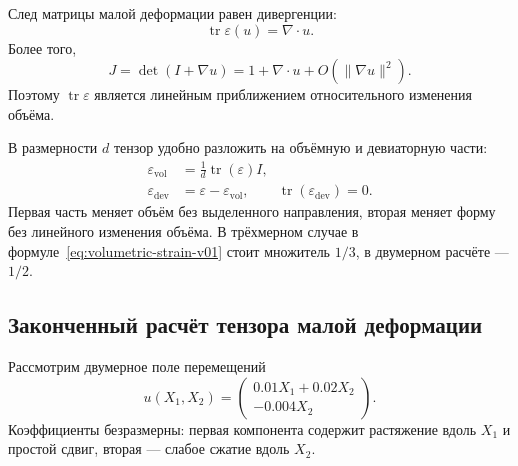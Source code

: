 След матрицы малой деформации равен дивергенции:
\begin{equation}
\label{eq:trace-strain-divergence-v01}
\operatorname{tr}\varepsilon(u)=\nabla\cdot u.
\end{equation}
Более того,
\begin{equation}
\label{eq:jacobian-linearization-v01}
J
=
\det(I+\nabla u)
=
1+\nabla\cdot u+O(\lVert\nabla u\rVert^2).
\end{equation}
Поэтому $\operatorname{tr}\varepsilon$ является линейным приближением относительного изменения объёма.

В размерности $d$ тензор удобно разложить на объёмную и девиаторную части:
\begin{align}
\varepsilon_{\mathrm{vol}}
&=
\frac1d\operatorname{tr}(\varepsilon)I,
\label{eq:volumetric-strain-v01}\\
\varepsilon_{\mathrm{dev}}
&=
\varepsilon-\varepsilon_{\mathrm{vol}},
\qquad
\operatorname{tr}(\varepsilon_{\mathrm{dev}})=0.
\label{eq:deviatoric-strain-v01}
\end{align}
Первая часть меняет объём без выделенного направления, вторая меняет форму без линейного изменения объёма. В трёхмерном случае в формуле~\eqref{eq:volumetric-strain-v01} стоит множитель $1/3$, в двумерном расчёте --- $1/2$.

\subsection{Законченный расчёт тензора малой деформации}
\label{subsec:strain-computation-v01}

Рассмотрим двумерное поле перемещений
\begin{equation}
\label{eq:worked-displacement-v01}
u(X_1,X_2)
=
\begin{pmatrix}
0.01X_1+0.02X_2\\
-0.004X_2
\end{pmatrix}.
\end{equation}
Коэффициенты безразмерны: первая компонента содержит растяжение вдоль $X_1$ и простой сдвиг, вторая --- слабое сжатие вдоль $X_2$.

